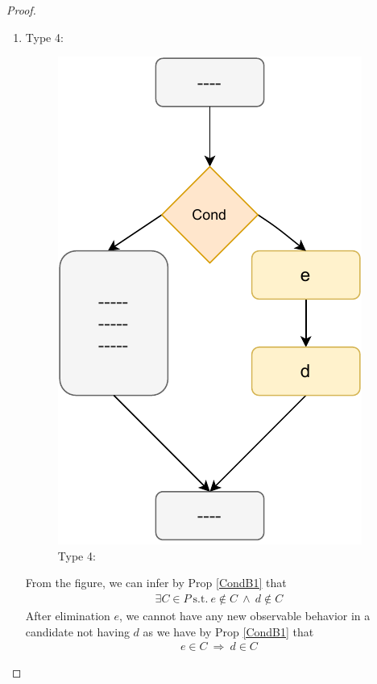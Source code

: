 \begin{proof}
\begin{itemize}
\begin{enumerate}
                        \item Type 4: 

                            \begin{figure}[H]
                                \centering 
                                \includegraphics[scale=0.7]{Elimination/ConditionalsProofFig4.pdf}
                                \caption{Type 4:}    
                            \end{figure}

                            From the figure, we can infer by Prop \ref{CondB1} that
                            \begin{align*}
                                \exists C \in P \ \text{s.t.} \ e \notin C \ \wedge \ d \notin C
                            \end{align*}
                            After elimination $e$, we cannot have any new observable behavior in a candidate not having $d$ as we have by Prop \ref{CondB1} that  
                            \begin{align*}
                                e \in C \ \Rightarrow \ d \in C
                            \end{align*}


\end{enumerate}
\end{itemize}
\end{proof}
